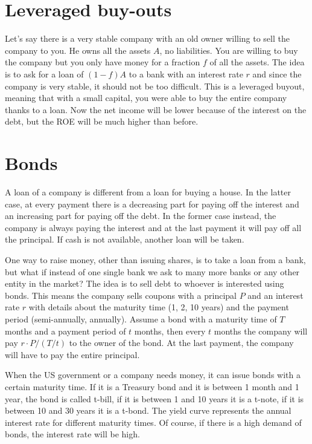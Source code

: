 \section{Leveraged buy-outs}
Let's say there is a very stable company with an old owner willing to sell the company to you. He owns all the assets $A$, no liabilities. You are willing to buy the company but you only have money for a fraction $f$ of all the assets. The idea is to ask for a loan of $(1-f)A$ to a bank with an interest rate $r$ and since the company is very stable, it should not be too difficult. This is a leveraged buyout, meaning that with a small capital, you were able to buy the entire company thanks to a loan. Now the net income will be lower because of the interest on the debt, but the ROE will be much higher than before.

\section{Bonds}
A loan of a company is different from a loan for buying a house. In the latter case, at every payment there is a decreasing part for paying off the interest and an increasing part for paying off the debt. In the former case instead, the company is always paying the interest and at the last payment it will pay off all the principal. If cash is not available, another loan will be taken.

One way to raise money, other than issuing shares, is to take a loan from a bank, but what if instead of one single bank we ask to many more banks or any other entity in the market? The idea is to sell debt to whoever is interested using bonds. This means the company sells coupons with a principal $P$ and an interest rate $r$ with details about the maturity time (1, 2, 10 years) and the payment period (semi-annually, annually). Assume a bond with a maturity time of $T$ months and a payment period of $t$ months, then every $t$ months the company will pay $r\cdot P/(T/t)$ to the owner of the bond. At the last payment, the company will have to pay the entire principal.

When the US government or a company needs money, it can issue bonds with a certain maturity time. If it is a Treasury bond and it is between 1 month and 1 year, the bond is called t-bill, if it is between 1 and 10 years it is a t-note, if it is between 10 and 30 years it is a t-bond. The yield curve represents the annual interest rate for different maturity times. Of course, if there is a high demand of bonds, the interest rate will be high.

